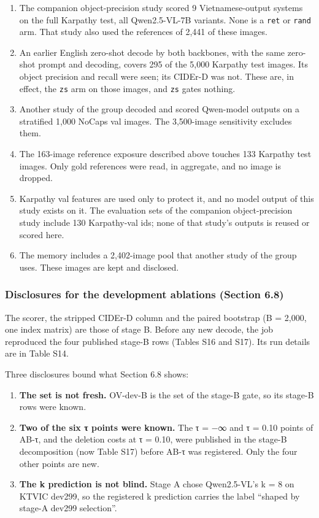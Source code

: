 \begin{enumerate}
\def\labelenumi{\arabic{enumi}.}
\tightlist
\item
  The companion object-precision study scored 9 Vietnamese-output systems on the full Karpathy test,
  all Qwen2.5-VL-7B variants. None is a \texttt{ret} or \texttt{rand} arm. That study also used the
  references of 2,441 of these images.
\item
  An earlier English zero-shot decode by both backbones, with the same zero-shot prompt and
  decoding, covers 295 of the 5,000 Karpathy test images. Its object precision and recall were seen;
  its CIDEr-D was not. These are, in effect, the \texttt{zs} arm on those images, and \texttt{zs}
  gates nothing.
\item
  Another study of the group decoded and scored Qwen-model outputs on a stratified 1,000 NoCaps val
  images. The 3,500-image sensitivity excludes them.
\item
  The 163-image reference exposure described above touches 133 Karpathy test images. Only gold
  references were read, in aggregate, and no image is dropped.
\item
  Karpathy val features are used only to protect it, and no model output of this study exists on it.
  The evaluation sets of the companion object-precision study include 130 Karpathy-val ids; none of
  that study's outputs is reused or scored here.
\item
  The memory includes a 2,402-image pool that another study of the group uses. These images are kept
  and disclosed.
\end{enumerate}

\subsubsection{Disclosures for the development ablations (Section
6.8)}\label{disclosures-for-the-development-ablations-section-6.8}

The scorer, the stripped CIDEr-D column and the paired bootstrap (B = 2,000, one index matrix) are
those of stage B. Before any new decode, the job reproduced the four published stage-B rows (Tables
S16 and S17). Its run details are in Table S14.

Three disclosures bound what Section 6.8 shows:

\begin{enumerate}
\def\labelenumi{\arabic{enumi}.}
\tightlist
\item
  \textbf{The set is not fresh.} OV-dev-B is the set of the stage-B gate, so its stage-B rows were
  known.
\item
  \textbf{Two of the six τ points were known.} The τ = −∞ and τ = 0.10 points of AB-τ, and the
  deletion costs at τ = 0.10, were published in the stage-B decomposition (now Table S17) before
  AB-τ was registered. Only the four other points are new.
\item
  \textbf{The k prediction is not blind.} Stage A chose Qwen2.5-VL's k = 8 on KTVIC dev299, so the
  registered k prediction carries the label ``shaped by stage-A dev299 selection''.
\end{enumerate}

